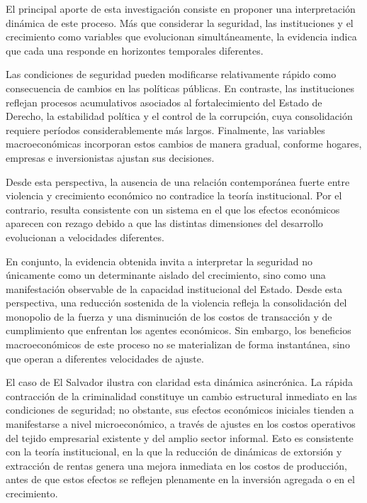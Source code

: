 \documentclass[11pt,a4paper]{article}
\begin{document}
El principal aporte de esta investigación consiste en proponer una interpretación dinámica de este proceso. Más que considerar la seguridad, las instituciones y el crecimiento como variables que evolucionan simultáneamente, la evidencia indica que cada una responde en horizontes temporales diferentes.

Las condiciones de seguridad pueden modificarse relativamente rápido como consecuencia de cambios en las políticas públicas. En contraste, las instituciones reflejan procesos acumulativos asociados al fortalecimiento del Estado de Derecho, la estabilidad política y el control de la corrupción, cuya consolidación requiere períodos considerablemente más largos. Finalmente, las variables macroeconómicas incorporan estos cambios de manera gradual, conforme hogares, empresas e inversionistas ajustan sus decisiones.

Desde esta perspectiva, la ausencia de una relación contemporánea fuerte entre violencia y crecimiento económico no contradice la teoría institucional. Por el contrario, resulta consistente con un sistema en el que los efectos económicos aparecen con rezago debido a que las distintas dimensiones del desarrollo evolucionan a velocidades diferentes.

En conjunto, la evidencia obtenida invita a interpretar la seguridad no únicamente como un determinante aislado del crecimiento, sino como una manifestación observable de la capacidad institucional del Estado. Desde esta perspectiva, una reducción sostenida de la violencia refleja la consolidación del monopolio de la fuerza y una disminución de los costos de transacción y de cumplimiento que enfrentan los agentes económicos. Sin embargo, los beneficios macroeconómicos de este proceso no se materializan de forma instantánea, sino que operan a diferentes velocidades de ajuste.

El caso de El Salvador ilustra con claridad esta dinámica asincrónica. La rápida contracción de la criminalidad constituye un cambio estructural inmediato en las condiciones de seguridad; no obstante, sus efectos económicos iniciales tienden a manifestarse a nivel microeconómico, a través de ajustes en los costos operativos del tejido empresarial existente y del amplio sector informal. Esto es consistente con la teoría institucional, en la que la reducción de dinámicas de extorsión y extracción de rentas genera una mejora inmediata en los costos de producción, antes de que estos efectos se reflejen plenamente en la inversión agregada o en el crecimiento.
\end{document}
